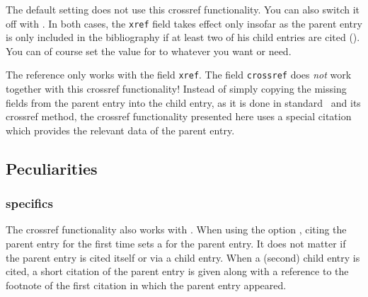 \documentclass[english]{scrartcl}
\begin{document}
The default setting does not use this crossref functionality. You can also switch 
it off with . In both cases, the \texttt{xref} field takes effect
only insofar as the parent entry is only included in the bibliography if at least
two of his child entries are cited (). You can of course set
the value for  to whatever you want or need.

\achtung{}The reference only works with the field \texttt{xref}. The field \texttt{crossref}
does \emph{not} work together with this crossref functionality! Instead of simply 
copying the missing fields from the parent entry into the child entry, as it is
done in standard \BibTeX\ and its crossref method, the crossref functionality
presented here uses a special citation which provides the relevant data of the
parent entry.

\subsection{Peculiarities}
\subsubsection{ specifics}
The crossref functionality also works with . When using the option
, citing the parent entry for the first time sets a  
for the parent entry. It does not matter if the parent entry is cited itself or via 
a child entry. When a (second) child entry is cited, a short citation of the parent 
entry is given along with a reference to the footnote of the first citation in which the
parent entry appeared.
\end{document}

